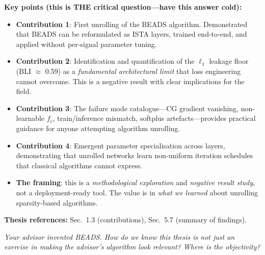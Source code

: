 \documentclass[11pt, letterpaper]{article}
\newcounter{qcounter}
\newcommand{\question}[1]{%
  \stepcounter{qcounter}%
  \begin{questionbox}[Q\theqcounter]%
    \itshape #1%
  \end{questionbox}%
}
\begin{document}
\begin{answerbox}
\textbf{Key points (this is THE critical question---have this answer cold):}
\begin{itemize}[nosep]
  \item \textbf{Contribution 1}: First unrolling of the BEADS
        algorithm.  Demonstrated that BEADS can be reformulated as
        ISTA layers, trained end-to-end, and applied without
        per-signal parameter tuning.
  \item \textbf{Contribution 2}: Identification and quantification
        of the $\ell_1$ leakage floor (BLI $\approx$ 0.59) as a
        \emph{fundamental architectural limit} that loss engineering
        cannot overcome.  This is a negative result with clear
        implications for the field.
  \item \textbf{Contribution 3}: The failure mode catalogue---CG
        gradient vanishing, non-learnable $f_c$, train/inference
        mismatch, softplus artefacts---provides practical guidance
        for anyone attempting algorithm unrolling.
  \item \textbf{Contribution 4}: Emergent parameter specialisation
        across layers, demonstrating that unrolled networks learn
        non-uniform iteration schedules that classical algorithms
        cannot express.
  \item \textbf{The framing}: this is a \emph{methodological
        exploration} and \emph{negative result study}, not a
        deployment-ready tool.  The value is in \emph{what we learned}
        about unrolling sparsity-based algorithms.
\end{itemize}
\textbf{Thesis references:} Sec.~1.3 (contributions), Sec.~5.7 (summary of findings).
\end{answerbox}

\question{Your advisor invented BEADS.  How do we know this thesis is not
just an exercise in making the advisor's algorithm look relevant?
Where is the objectivity?}
\end{document}
